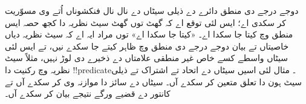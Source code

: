 \documentclass[../../../include/open-logic-section]{subfiles}
\begin{document}


دوجے درجے دی منطق دائرے دے ذیلی سیٹاں دے نال نال فنکشوناں اُتے وی
مسوّریت کر سکدی اے؛ ایس لئی توقع اے کہ گھٹ توں گھٹ سیٹ نظریہ دا
کجھ حصہ ایس منطق وچ کیتا جا سکدا اے۔ «کیتا جا سکدا اے» توں مراد
ایہ اے کہ سیٹ نظریہ دیاں خاصیتاں تے بیان دوجے درجے دی منطق
وچ ظاہر کیتے جا سکدے نیں، تے ایس لئی سیٹاں واسطے کسے خاص غیر منطقی
علامتاں دے ذخیرے دی لوڑ نہیں، مثلاً سیٹ نظریہ وچ رکنیت دا
!!{predicate}۔ مثال لئی اسیں سیٹاں دے اتحاد تے اشتراک تے ذیلی سیٹ
ہون دا تعلق متعین کر سکدے آں۔ سیٹاں دے سائز دا موازنہ وی کر سکدے آں تے کانتور دے قضیے ورگے نتیجے بیان کر سکدے آں۔
\end{document}

